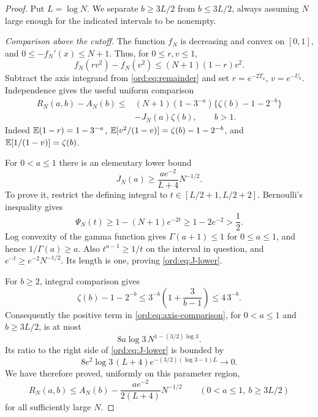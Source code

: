\begin{proof}
Put $L=\log N$. We separate $b\ge3L/2$ from $b\le3L/2$, always
assuming $N$ large enough for the indicated intervals to be nonempty.

\emph{Comparison above the cutoff.}
The function $f_N$ is decreasing and convex on $[0,1]$, and
$0\le-f_N'(x)\le N+1$. Thus, for $0\le r,v\le1$,
\[
 f_N(rv^2)-f_N(v^2)\le(N+1)(1-r)v^2.
\]
Subtract the axis integrand from \eqref{ord:eq:remainder} and set
$r=e^{-2T_a}$, $v=e^{-U_b}$. Independence gives the useful uniform
comparison
\begin{equation}\label{ord:eq:axis-comparison}
 \begin{split}
 R_N(a,b)-A_N(b)\le{}&
 (N+1)(1-3^{-a})\{\zeta(b)-1-2^{-b}\}\\
 &-J_N(a)\zeta(b),\qquad b>1.
 \end{split}
\end{equation}
Indeed $\mathbb E(1-r)=1-3^{-a}$,
$\mathbb E[v^2/(1-v)]=\zeta(b)-1-2^{-b}$, and
$\mathbb E[1/(1-v)]=\zeta(b)$.

For $0<a\le1$ there is an elementary lower bound
\begin{equation}\label{ord:eq:J-lower}
 J_N(a)\ge\frac{ae^{-2}}{L+4}N^{-1/2}.
\end{equation}
To prove it, restrict the defining integral to
$t\in[L/2+1,L/2+2]$. Bernoulli's inequality gives
\[
 \Psi_N(t)\ge1-(N+1)e^{-2t}\ge1-2e^{-2}>\frac12.
\]
Log convexity of the gamma function gives $\Gamma(a+1)\le1$ for
$0\le a\le1$, and hence $1/\Gamma(a)\ge a$. Also
$t^{a-1}\ge1/t$ on the interval in question, and
$e^{-t}\ge e^{-2}N^{-1/2}$. Its length is one, proving
\eqref{ord:eq:J-lower}.

For $b\ge2$, integral comparison gives
\[
 \zeta(b)-1-2^{-b}
 \le3^{-b}\left(1+\frac3{b-1}\right)\le4\,3^{-b}.
\]
Consequently the positive term in \eqref{ord:eq:axis-comparison}, for
$0<a\le1$ and $b\ge3L/2$, is at most
\[
 8a\log3\,N^{1-(3/2)\log3}.
\]
Its ratio to the right side of \eqref{ord:eq:J-lower} is bounded by
\[
 8e^2\log3\,(L+4)
       e^{-(3/2)(\log3-1)L}\longrightarrow0.
\]
We have therefore proved, uniformly on this parameter region,
\begin{equation}\label{ord:eq:strict-axis-gap}
 R_N(a,b)\le A_N(b)-\frac{ae^{-2}}{2(L+4)}N^{-1/2}
 \qquad(0<a\le1,\ b\ge3L/2)
\end{equation}
for all sufficiently large $N$.


\end{proof}
